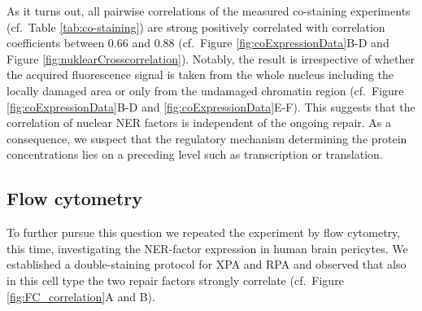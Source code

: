 \noindent As it turns out, all pairwise correlations of the measured co-staining experiments (cf.\ Table \ref{tab:co-staining}) are strong positively correlated with correlation coefficients between 0.66 and 0.88 (cf.\ Figure \ref{fig:coExpressionData}B-D and Figure \ref{fig:nuklearCrosscorrelation}). Notably, the result is irrespective of whether the acquired fluorescence signal is taken from the whole nucleus including the locally damaged area or only from the undamaged chromatin region (cf.\ Figure \ref{fig:coExpressionData}B-D and \ref{fig:coExpressionData}E-F). This suggests that the correlation of nuclear NER factors is independent of the ongoing repair. As a consequence, we suspect that the regulatory mechanism determining the protein concentrations lies on a preceding level such as transcription or translation.\\  



\subsection{Flow cytometry}

To further pursue this question we repeated the experiment by flow cytometry, this time, investigating the NER-factor expression in human brain pericytes. We established a double-staining protocol for XPA and RPA and observed that also in this cell type the two repair factors strongly correlate (cf.\ Figure \ref{fig:FC_correlation}A and B).    

 

